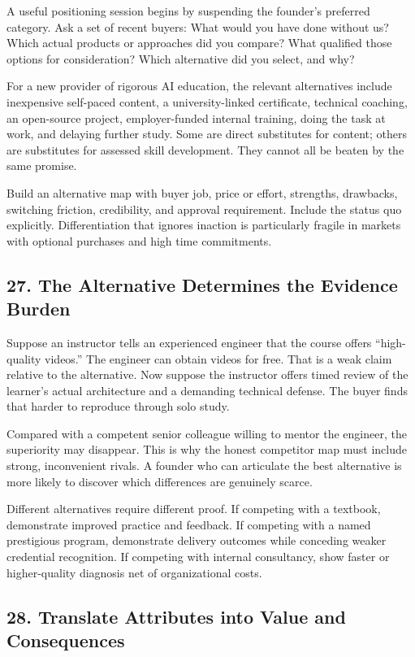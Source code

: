A useful positioning session begins by suspending the founder's preferred category. Ask a set of recent buyers: What would you have done without us? Which actual products or approaches did you compare? What qualified those options for consideration? Which alternative did you select, and why?

For a new provider of rigorous AI education, the relevant alternatives include inexpensive self-paced content, a university-linked certificate, technical coaching, an open-source project, employer-funded internal training, doing the task at work, and delaying further study. Some are direct substitutes for content; others are substitutes for assessed skill development. They cannot all be beaten by the same promise.

Build an alternative map with buyer job, price or effort, strengths, drawbacks, switching friction, credibility, and approval requirement. Include the status quo explicitly. Differentiation that ignores inaction is particularly fragile in markets with optional purchases and high time commitments.

\subsection*{27. The Alternative Determines the Evidence Burden}

Suppose an instructor tells an experienced engineer that the course offers ``high-quality videos.'' The engineer can obtain videos for free. That is a weak claim relative to the alternative. Now suppose the instructor offers timed review of the learner's actual architecture and a demanding technical defense. The buyer finds that harder to reproduce through solo study.

Compared with a competent senior colleague willing to mentor the engineer, the superiority may disappear. This is why the honest competitor map must include strong, inconvenient rivals. A founder who can articulate the best alternative is more likely to discover which differences are genuinely scarce.

Different alternatives require different proof. If competing with a textbook, demonstrate improved practice and feedback. If competing with a named prestigious program, demonstrate delivery outcomes while conceding weaker credential recognition. If competing with internal consultancy, show faster or higher-quality diagnosis net of organizational costs.

\subsection*{28. Translate Attributes into Value and Consequences}

